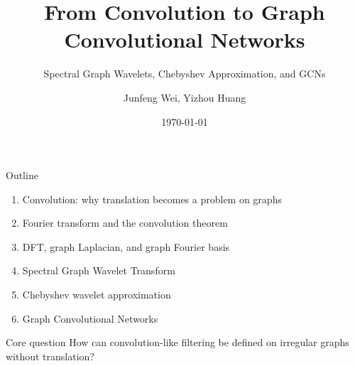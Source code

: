 \documentclass[aspectratio=1610,xcolor=dvipsnames,t]{beamer}
\title[From Convolution to GCN]{From Convolution to Graph Convolutional Networks}
\subtitle{Spectral Graph Wavelets, Chebyshev Approximation, and GCNs}
\author[Junfeng Wei, Yizhou Huang]{Junfeng Wei, Yizhou Huang}
\date{\today}
\institute[Uni HD]{
Heidelberg University\\
Institute of Computer Science}
\begin{document}
\frame[plain]{\titlepage}

\begin{frame}{Outline}
\begin{enumerate}
  \item Convolution: why translation becomes a problem on graphs
  \item Fourier transform and the convolution theorem
  \item DFT, graph Laplacian, and graph Fourier basis
  \item Spectral Graph Wavelet Transform
  \item Chebyshev wavelet approximation
  \item Graph Convolutional Networks
\end{enumerate}

\medskip
\begin{block}{Core question}
How can convolution-like filtering be defined on irregular graphs without translation?
\end{block}
\end{frame}
\end{document}
